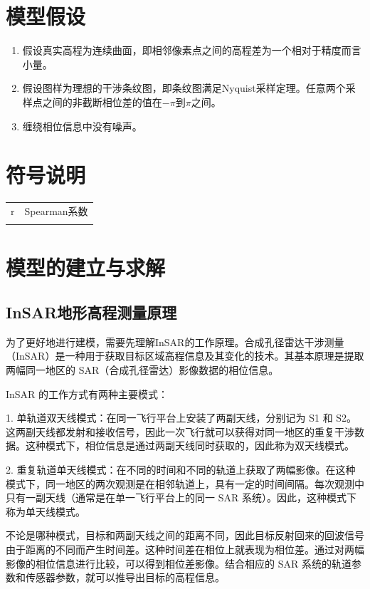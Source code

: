 \documentclass[a4paper]{article}
\begin{document}
	\section{模型假设}
	\begin{enumerate} 
		\item 假设真实高程为连续曲面，即相邻像素点之间的高程差为一个相对于精度而言小量。
		\item 假设图样为理想的干涉条纹图，即条纹图满足Nyquist采样定理。任意两个采样点之间的非截断相位差的值在$ -\pi $到$ \pi $之间。
		\item 缠绕相位信息中没有噪声。
	\end{enumerate}
	
	\section{符号说明}
	\begin{table}[H] %
		\captionsetup{skip=4pt} %
		\centering
		\setlength{\arrayrulewidth}{1.5pt} %
		\begin{tabular}{cc} %
			\hline
			\makebox[0.15\textwidth][c]{符号} & \makebox[0.79\textwidth][c]{说明}  \\ 
			\toprule
			r & Spearman系数  \\
			 &   \\
			\hline
		\end{tabular}
	\end{table}
	
	
	\section{模型的建立与求解}
	\subsection{InSAR地形高程测量原理}

	为了更好地进行建模，需要先理解InSAR的工作原理。合成孔径雷达干涉测量（InSAR）是一种用于获取目标区域高程信息及其变化的技术。其基本原理是提取两幅同一地区的 SAR（合成孔径雷达）影像数据的相位信息。\par
	InSAR 的工作方式有两种主要模式：\par
	1. 单轨道双天线模式：在同一飞行平台上安装了两副天线，分别记为 S1 和 S2。这两副天线都发射和接收信号，因此一次飞行就可以获得对同一地区的重复干涉数据。这种模式下，相位信息是通过两副天线同时获取的，因此称为双天线模式。\par
	2. 重复轨道单天线模式：在不同的时间和不同的轨道上获取了两幅影像。在这种模式下，同一地区的两次观测是在相邻轨道上，具有一定的时间间隔。每次观测中只有一副天线（通常是在单一飞行平台上的同一 SAR 系统）。因此，这种模式下称为单天线模式。\par
	不论是哪种模式，目标和两副天线之间的距离不同，因此目标反射回来的回波信号由于距离的不同而产生时间差。这种时间差在相位上就表现为相位差。通过对两幅影像的相位信息进行比较，可以得到相位差影像。结合相应的 SAR 系统的轨道参数和传感器参数，就可以推导出目标的高程信息。
	
\end{document}
